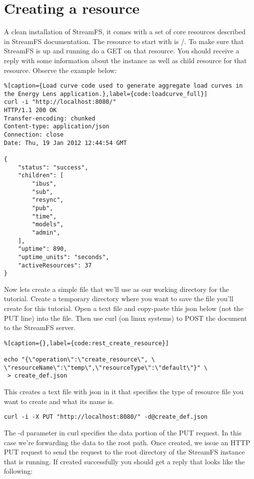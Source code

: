   
\section{Creating a resource}

A clean installation of StreamFS, it comes with a set of core resources described in StreamFS documentation. The resource to start with is /. To make sure that StreamFS is up and running do a GET on that resource. You should receive a reply with some information about the instance as well as child resource for that resource. Observe the example below:

\begin{lstlisting}%[caption={Load curve code used to generate aggregate load curves in the Energy Lens application.},label={code:loadcurve_full}]
curl -i "http://localhost:8080/"
HTTP/1.1 200 OK
Transfer-encoding: chunked
Content-type: application/json
Connection: close
Date: Thu, 19 Jan 2012 12:44:54 GMT

{
    "status": "success",
    "children": [
        "ibus",
        "sub",
        "resync",
        "pub",
        "time",
        "models",
        "admin",
    ],
    "uptime": 890,
    "uptime_units": "seconds",
    "activeResources": 37
}
\end{lstlisting}

Now lets create a simple file that we'll use as our working directory for the tutorial. Create a temporary directory where you want to save the file you'll create for this tutorial. Open a text file and copy-paste this json below (not the PUT line) into the file. Then use curl (on linux systems) to POST the document to the StreamFS server.

\begin{lstlisting}%[caption={},label={code:rest_create_resource}]

echo "{\"operation\":\"create_resource\", \
\"resourceName\":\"temp\",\"resourceType\":\"default\"}" \
 > create_def.json

 \end{lstlisting}

This creates a text file with json in it that specifies the type of resource file you want to create and what its name is.

\begin{lstlisting}
curl -i -X PUT "http://localhost:8080/" -d@create_def.json
 \end{lstlisting}

The -d parameter in curl specifies the data portion of the PUT request. In this case we're forwarding the data to the root path. Once created, we issue an HTTP PUT request to send the request to the root directory of the StreamFS instance that is running. If created successfully you should get a reply that looks like the following:

